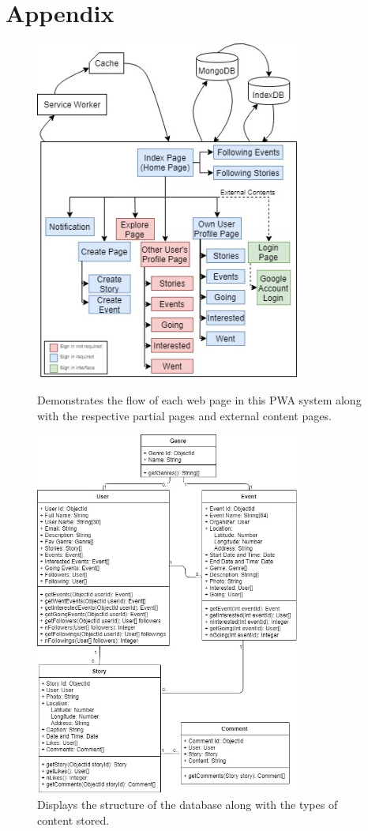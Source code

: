 \documentclass[11pt, a4paper]{article}
\begin{document}
\section{Appendix}
\begin{figure}[H]
  \begin{center}
      \includegraphics[width=8.7cm]{site_map.jpg}
      \caption{Demonstrates the flow of each web page in this PWA system along with the respective
      partial pages and external content pages.}
      \label{figure:site_map}

      \includegraphics[width=8.7cm]{uml.jpg}
      \caption{Displays the structure of the database along with the types of content stored.}
      \label{figure:uml}
  \end{center}
\end{figure}
\end{document}
